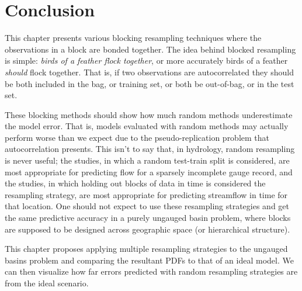 \section{Conclusion} \label{ch5:conclusion}
This chapter presents various blocking resampling techniques where the observations in a block are bonded together. The idea behind blocked resampling is simple: \textit{birds of a feather flock together}, or more accurately birds of a feather \textit{should} flock together. That is, if two observations are autocorrelated they should be both included in the bag, or training set, or both be out-of-bag, or in the test set. 

These blocking methods should show how much random methods underestimate the model error. That is, models evaluated with random methods may actually perform worse than we expect due to the pseudo-replication problem that autocorrelation presents. This isn't to say that, in hydrology, random resampling is never useful; the studies, in which a random test-train split is considered, are most appropriate for predicting flow for a sparsely incomplete gauge record, and the studies, in which holding out blocks of data in time is considered the resampling strategy, are most appropriate for predicting streamflow in time for that location. One should not expect to use these resampling strategies and get the same predictive accuracy in a purely ungauged basin problem, where blocks are supposed to be designed across geographic space (or hierarchical structure). 

This chapter proposes applying multiple resampling strategies to the ungauged basins problem and comparing the resultant PDFs to that of an ideal model. We can then visualize how far errors predicted with random resampling strategies are from the ideal scenario. 




